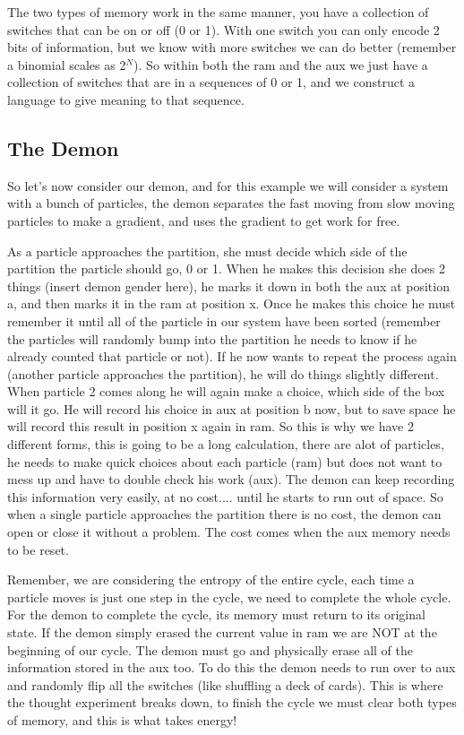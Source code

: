 \documentclass{article}
\begin{document}
The two types of memory work in the same manner, you have a collection of switches that can be on or off (0 or 1). 
With one switch you can only encode 2 bits of information, but we know with more switches we can do better (remember a binomial scales as 2$^N$). 
So within both the ram and the aux we just have a collection of switches that are in a sequences of 0 or 1, and we construct a language to give meaning to that sequence. 

\subsection{The Demon}
So let's now consider our demon, and for this example we will consider a system with a bunch of particles, the demon separates the fast moving from slow moving particles to make a gradient, and uses the gradient to get work for free. 

As a particle approaches the partition, she must decide which side of the partition the particle should go, 0 or 1. 
When he makes this decision she does 2 things (insert demon gender here), he marks it down in both the aux at position a, and then marks it in the ram at position x. 
Once he makes this choice he must remember it until all of the particle in our system have been sorted (remember the particles will randomly bump into the partition he needs to know if he already counted that particle or not). 
If he now wants to repeat the process again (another particle approaches the partition), he will do things slightly different.
When particle 2 comes along he will again make a choice, which side of the box will it go. 
He will record his choice in aux at position b now, but to save space he will record this result in position x again in ram. 
So this is why we have 2 different forms, this is going to be a long calculation, there are alot of particles, he needs to make quick choices about each particle (ram) but does not want to mess up and have to double check his work (aux).
The demon can keep recording this information very easily, at no cost.... until he starts to run out of space.
So when a single particle approaches the partition there is no cost, the demon can open or close it without a problem.
The cost comes when the aux memory needs to be reset.

Remember, we are considering the entropy of the entire cycle, each time a particle moves is just one step in the cycle, we need to complete the whole cycle. 
For the demon to complete the cycle, its memory must return to its original state. 
If the demon simply erased the current value in ram we are NOT at the beginning of our cycle.
The demon must go and physically erase all of the information stored in the aux too. 
To do this the demon needs to run over to aux and randomly flip all the switches (like shuffling a deck of cards).
This is where the thought experiment breaks down, to finish the cycle we must clear both types of memory, and this is what takes energy!
\end{document}
